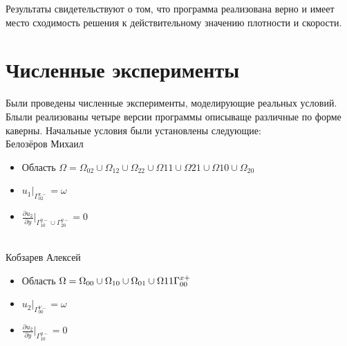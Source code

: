 \documentclass[a4paper, 25pt]{article}
\begin{document}
Результаты свидетельствуют о том, что программа реализована верно и имеет место сходимость решения к действительному значению плотности и скорости.
\newpage

\section {Численные эксперименты}

Были проведены численные эксперименты, моделирующие реальных условий.
Блыли реализованы четыре версии программы описываще различные по форме каверны.
Начальные условия были установлены следующие:\\
Белозёров Михаил
\begin {itemize}
\item Область $\Omega = \Omega_{02} \cup \Omega_{12} \cup \Omega_{22} \cup \Omega{11} \cup \Omega{21} \cup \Omega{10} \cup \Omega_{20}$
  \item $u_1|_{\Gamma_{02}^{x-}} = \omega$
  \item $\frac{{\partial}u_2}{{\partial}y}|_{\Gamma_{10}^{y-}\cup\Gamma_{20}^{y-}} = 0$
\end   {itemize}\\
Кобзарев Алексей
\begin {itemize}
\item Область $\Omega = \Omega_{00} \cup \Omega_{10} \cup \Omega_{01} \cup \Omega{11} \\ \Gamma^{x+}_{00}$
  \item $u_2|_{\Gamma_{00}^{Y-}} = \omega$
  \item $\frac{{\partial}u_2}{{\partial}y}|_{\Gamma_{10}^{y-}} = 0$
\end   {itemize}
\end{document}
